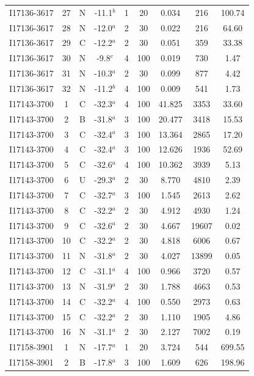 \begin{table}
\begin{tabular}{ccccccccc}
I17136-3617 & 27 & N & -11.1$^{b}$ & 1 & 20 & 0.034 & 216 & 100.74 \\
I17136-3617 & 28 & N & -12.0$^{a}$ & 2 & 30 & 0.022 & 216 & 64.60 \\
I17136-3617 & 29 & C & -12.2$^{a}$ & 2 & 30 & 0.051 & 359 & 33.38 \\
I17136-3617 & 30 & N & -9.8$^{c}$ & 4 & 100 & 0.019 & 730 & 1.47 \\
I17136-3617 & 31 & N & -10.3$^{a}$ & 2 & 30 & 0.099 & 877 & 4.42 \\
I17136-3617 & 32 & N & -11.2$^{b}$ & 4 & 100 & 0.009 & 541 & 1.73 \\
I17143-3700 & 1 & C & -32.3$^{a}$ & 4 & 100 & 41.825 & 3353 & 33.60 \\
I17143-3700 & 2 & B & -31.8$^{a}$ & 3 & 100 & 20.477 & 3418 & 15.53 \\
I17143-3700 & 3 & C & -32.4$^{a}$ & 3 & 100 & 13.364 & 2865 & 17.20 \\
I17143-3700 & 4 & C & -32.4$^{a}$ & 3 & 100 & 12.626 & 1936 & 52.69 \\
I17143-3700 & 5 & C & -32.6$^{a}$ & 4 & 100 & 10.362 & 3939 & 5.13 \\
I17143-3700 & 6 & U & -29.3$^{a}$ & 2 & 30 & 8.770 & 4810 & 2.39 \\
I17143-3700 & 7 & C & -32.7$^{a}$ & 3 & 100 & 1.545 & 2613 & 2.62 \\
I17143-3700 & 8 & C & -32.2$^{a}$ & 2 & 30 & 4.912 & 4930 & 1.24 \\
I17143-3700 & 9 & C & -32.6$^{a}$ & 2 & 30 & 4.667 & 19607 & 0.02 \\
I17143-3700 & 10 & C & -32.2$^{a}$ & 2 & 30 & 4.818 & 6006 & 0.67 \\
I17143-3700 & 11 & N & -31.8$^{a}$ & 2 & 30 & 4.027 & 13899 & 0.05 \\
I17143-3700 & 12 & C & -31.1$^{a}$ & 4 & 100 & 0.966 & 3720 & 0.57 \\
I17143-3700 & 13 & N & -31.9$^{a}$ & 2 & 30 & 1.788 & 4663 & 0.53 \\
I17143-3700 & 14 & C & -32.2$^{a}$ & 4 & 100 & 0.550 & 2973 & 0.63 \\
I17143-3700 & 15 & C & -32.2$^{a}$ & 2 & 30 & 1.110 & 1905 & 4.86 \\
I17143-3700 & 16 & N & -31.1$^{a}$ & 2 & 30 & 2.127 & 7002 & 0.19 \\
I17158-3901 & 1 & N & -17.7$^{a}$ & 1 & 20 & 3.724 & 544 & 699.55 \\
I17158-3901 & 2 & B & -17.8$^{a}$ & 3 & 100 & 1.609 & 626 & 198.96 \\

\end{tabular}
\end{table}
